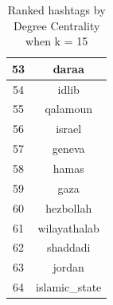 \documentclass[conference]{IEEEtran}
\begin{document}
\begin{table}[ht]
\begin{tabular} { | c | c | }
            53   & daraa          \\
            \hline
            54   & idlib          \\
            \hline
            55   & qalamoun       \\
            \hline
            56   & israel         \\
            \hline
            57   & geneva         \\
            \hline
            58   & hamas          \\
            \hline
            59   & gaza           \\
            \hline
            60   & hezbollah      \\
            \hline
            61   & wilayathalab   \\
            \hline
            62   & shaddadi       \\
            \hline
            63   & jordan         \\
            \hline
            64   & islamic\_state  \\
            \hline

        \end{tabular}
        \caption {Ranked hashtags by Degree Centrality when k = 15}
        \label{tab:hashtag-ranks-k-15}
    \end{table}
\end{document}
